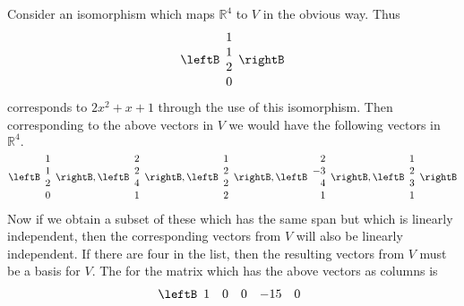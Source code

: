 \begin{solution}
Consider an isomorphism which maps $\mathbb{R}%
^{4}$ to $V$ in the obvious way. Thus 
\begin{equation*}
\leftB 
\begin{array}{c}
1 \\ 
1 \\ 
2 \\ 
0
\end{array}
\rightB
\end{equation*}
corresponds to $2x^{2}+x+1$ through the use of this isomorphism. Then
corresponding to the above vectors in $V$ we would have the following
vectors in $\mathbb{R}^{4}.$ 
\begin{equation*}
\leftB 
\begin{array}{c}
1 \\ 
1 \\ 
2 \\ 
0
\end{array}
\rightB ,\leftB 
\begin{array}{c}
2 \\ 
2 \\ 
4 \\ 
1
\end{array}
\rightB ,\leftB 
\begin{array}{c}
1 \\ 
2 \\ 
2 \\ 
2
\end{array}
\rightB ,\leftB 
\begin{array}{r}
2 \\ 
-3 \\ 
4 \\ 
1
\end{array}
\rightB ,\leftB 
\begin{array}{c}
1 \\ 
2 \\ 
3 \\ 
1
\end{array}
\rightB
\end{equation*}
Now if we obtain a subset of these which has the same span but which is
linearly independent, then the corresponding vectors from $V$ will also be
linearly independent. If there are four
in the list, then the resulting vectors from $V$ must be a basis for $V$.
The {\rref} for the matrix which has the above vectors as
columns is 
\begin{equation*}
\leftB 
\begin{array}{rrrrr}
1 & 0 & 0 & -15 & 0 \\ 

\end{array}
\end{equation*}
\end{solution}
